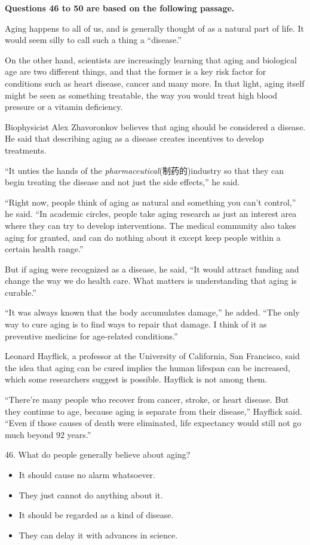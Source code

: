 \documentclass[UTF8,11pt]{ctexart}
\begin{document}
\textbf{Questions 46 to 50 are based on the following passage.}


Aging happens to all of us, and is generally thought of as a natural part of life. It would seem silly to call such a thing a “disease.”


On the other hand, scientists are increasingly learning that aging and biological age are two different things, and that the former is a key risk factor for conditions such as heart disease, cancer and many more. In that light, aging itself might be seen as something treatable, the way you would treat high blood pressure or a vitamin deficiency.


Biophysicist Alex Zhavoronkov believes that aging should be considered a disease. He said that describing aging as a disease creates incentives to develop treatments.


“It unties the hands of the\textit{ pharmaceutical}(制药的)industry so that they can begin treating the disease and not just the side effects,” he said.


“Right now, people think of aging as natural and something you can’t control,” he said. “In academic circles, people take aging research as just an interest area where they can try to develop interventions. The medical community also takes aging for granted, and can do nothing about it except keep people within a certain health range.”


But if aging were recognized as a disease, he said, “It would attract funding and change the way we do health care. What matters is understanding that aging is curable.”


“It was always known that the body accumulates damage,” he added. “The only way to cure aging is to find ways to repair that damage. I think of it as preventive medicine for age-related conditions.”


Leonard Hayflick, a professor at the University of California, San Francisco, said the idea that aging can be cured implies the human lifespan can be increased, which some researchers suggest is possible. Hayflick is not among them.


“There’re many people who recover from cancer, stroke, or heart disease. But they continue to age, because aging is separate from their disease,” Hayflick said. “Even if those causes of death were eliminated, life expectancy would still not go much beyond 92 years.”


46. What do people generally believe about aging?


\begin{itemize}[leftmargin=2em,itemsep=.2em,topsep=.4em]\item[A.] It should cause no alarm whatsoever.
\item[B.] They just cannot do anything about it.
\item[C.] It should be regarded as a kind of disease.
\item[D.] They can delay it with advances in science.
\end{itemize}
\end{document}

